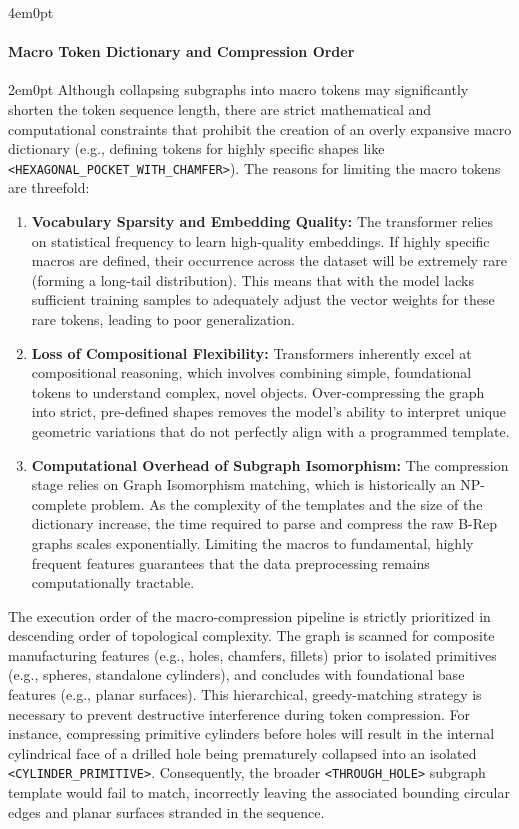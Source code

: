\begin{indentedblock}{4em}{0pt}
				\paragraph{Macro Token Dictionary and Compression Order}
					\begin{indentedblock}{2em}{0pt}
						Although collapsing subgraphs into macro tokens may significantly shorten the token sequence length, there are strict mathematical and computational constraints that prohibit the creation of an overly expansive macro dictionary (e.g., defining tokens for highly specific shapes like \texttt{<HEXAGONAL\_POCKET\_WITH\_CHAMFER>}). The reasons for limiting the macro tokens are threefold:
						
						\begin{sloppypar}
						\begin{enumerate}
							\item \textbf{Vocabulary Sparsity and Embedding Quality:} The transformer relies on statistical frequency to learn high-quality embeddings. If highly specific macros are defined, their occurrence across the dataset will be extremely rare (forming a long-tail distribution). This means that with the model lacks sufficient training samples to adequately adjust the vector weights for these rare tokens, leading to poor generalization.
							\item \textbf{Loss of Compositional Flexibility:} Transformers inherently excel at compositional reasoning, which involves combining simple, foundational tokens to understand complex, novel objects. Over-compressing the graph into strict, pre-defined shapes removes the model's ability to interpret unique geometric variations that do not perfectly align with a programmed template.
							\item \textbf{Computational Overhead of Subgraph Isomorphism:} The compression stage relies on Graph Isomorphism matching, which is historically an NP-complete problem. As the complexity of the templates and the size of the dictionary increase, the time required to parse and compress the raw B-Rep graphs scales exponentially. Limiting the macros to fundamental, highly frequent features guarantees that the data preprocessing remains computationally tractable.
						\end{enumerate}
						\end{sloppypar}
						The execution order of the macro-compression pipeline is strictly prioritized in descending order of topological complexity. The graph is scanned for composite manufacturing features (e.g., holes, chamfers, fillets) prior to isolated primitives (e.g., spheres, standalone cylinders), and concludes with foundational base features (e.g., planar surfaces). This hierarchical, greedy-matching strategy is necessary to prevent destructive interference during token compression. For instance, compressing primitive cylinders before holes will result in the internal cylindrical face of a drilled hole being prematurely collapsed into an isolated \texttt{<CYLINDER\_PRIMITIVE>}. Consequently, the broader \texttt{<THROUGH\_HOLE>} subgraph template would fail to match, incorrectly leaving the associated bounding circular edges and planar surfaces stranded in the sequence. 

\end{indentedblock}
\end{indentedblock}

